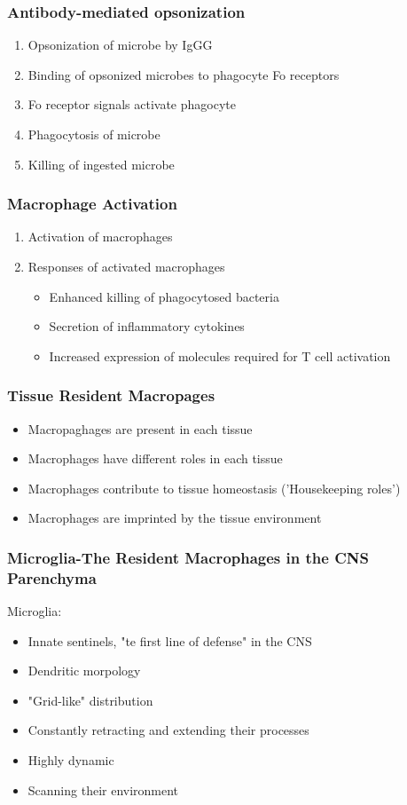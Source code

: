 \begin{itemize}
\begin{itemize}
\subsubsection{Antibody-mediated opsonization}
\begin{enumerate}
    \item Opsonization of microbe by IgGG
    \item Binding of opsonized microbes to phagocyte Fo receptors
    \item Fo receptor signals activate phagocyte
    \item Phagocytosis of microbe
    \item Killing of ingested microbe
\end{enumerate}


\subsubsection{Macrophage Activation}
\begin{enumerate}
    \item Activation of macrophages
\item Responses of activated macrophages
\begin{itemize}
    \item Enhanced killing of phagocytosed bacteria
    \item Secretion of inflammatory cytokines
    \item Increased expression of molecules required for T cell activation
\end{itemize}
\end{enumerate}

\subsubsection{Tissue Resident Macropages}
\begin{itemize}
    \item Macropaghages are present in each tissue
    \item Macrophages have different roles in each tissue
    \item Macrophages contribute to tissue homeostasis ('Housekeeping roles')
    \item Macrophages are imprinted by the tissue environment
\end{itemize}
\subsubsection{Microglia-The Resident Macrophages in the CNS Parenchyma}
Microglia:
\begin{itemize}
    \item Innate sentinels, "te first line of defense" in the CNS
    \item Dendritic morpology
    \item "Grid-like" distribution
    \item Constantly retracting and extending their processes
    \item Highly dynamic
    \item Scanning their environment
\end{itemize}


\end{itemize}
\end{itemize}

